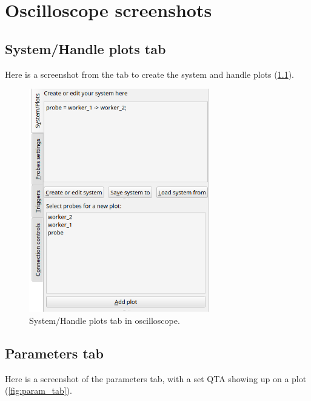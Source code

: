 \chapter{Oscilloscope screenshots}

\section{System/Handle plots tab} \label{app:sidetab_ex}
    Here is a screenshot from the tab to create the system and handle plots (\cref{fig:sidetab_ex}).

    \begin{figure}[H]
        \begin{center}
            \includegraphics[width = 0.7\textwidth]{img/new_sys_cre.png}
        \end{center}
        \caption{System/Handle plots tab in oscilloscope.}
        \label{fig:sidetab_ex}
    \end{figure}


\section{Parameters tab} \label{app:param_tab}
    Here is a screenshot of the parameters tab, with a set QTA showing up on a plot (\cref{fig:param_tab}).

